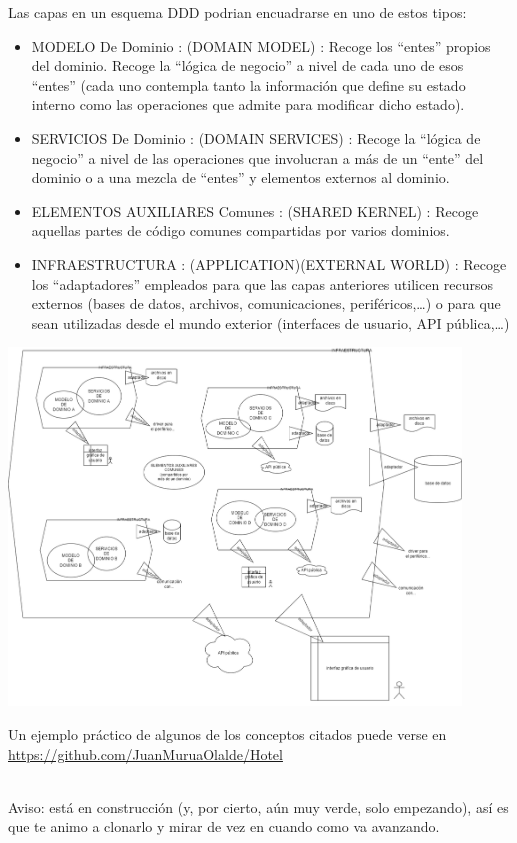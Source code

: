 \documentclass[spanish,12pt,a4paper,final,oneside]{book}
\begin{document}
Las capas en un esquema DDD podrian encuadrarse en uno de estos tipos:
\begin{itemize}
\item MODELO De Dominio : (DOMAIN MODEL) : Recoge los ``entes'' propios del dominio. Recoge la ``lógica de negocio'' a nivel de cada uno de esos ``entes'' (cada uno contempla tanto la información que define su estado interno como las operaciones que admite para modificar dicho estado).
\item SERVICIOS De Dominio : (DOMAIN SERVICES) : Recoge la ``lógica de negocio'' a nivel de las operaciones que involucran a más de un ``ente'' del dominio o a una mezcla de ``entes'' y elementos externos al dominio.
\item ELEMENTOS AUXILIARES Comunes : (SHARED KERNEL) : Recoge aquellas partes de código comunes compartidas por varios dominios.
\item INFRAESTRUCTURA : (APPLICATION)(EXTERNAL WORLD) : Recoge los ``adaptadores'' empleados para que las  capas anteriores utilicen recursos externos (bases de datos, archivos, comunicaciones, periféricos,\ldots) o para que sean utilizadas desde el mundo exterior (interfaces de usuario, API pública,\ldots)
\end{itemize}

\begin{center}\includegraphics[width=0.9\textwidth]{division en capas - DDD}\end{center}


\begin{footnotesize}
Un ejemplo práctico de algunos de los conceptos citados puede verse en
\\ \url{https://github.com/JuanMuruaOlalde/Hotel}
\end{footnotesize}
\begin{scriptsize}
\\Aviso: está en construcción (y, por cierto, aún muy verde, solo empezando), así es que te animo a clonarlo y mirar de vez en cuando como va avanzando.
\end{scriptsize}
\end{document}
